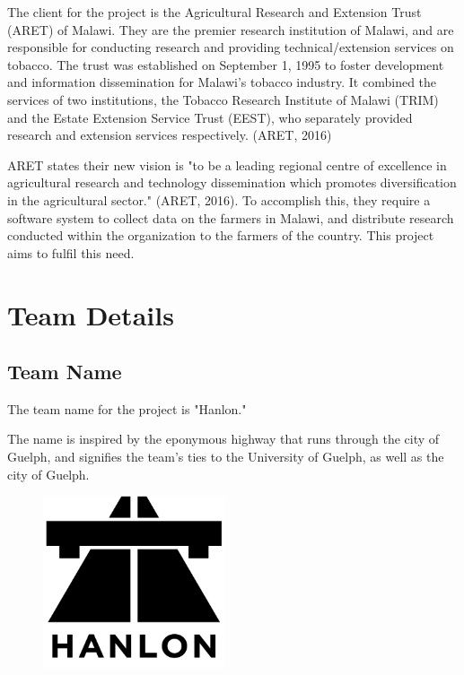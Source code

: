 \documentclass[12pt,letterpaper]{article}
\begin{document}
The client for the project is the Agricultural Research and Extension Trust (ARET) of Malawi. They are the premier research institution of Malawi, and are responsible for conducting research and providing technical/extension services on tobacco. The trust was established on September 1, 1995 to foster development and information dissemination for Malawi's tobacco industry. It combined the services of two institutions, the Tobacco Research Institute of Malawi (TRIM) and the Estate Extension Service Trust (EEST), who separately provided research and extension services respectively. (ARET, 2016)

ARET states their new vision is "to be a leading regional centre of excellence in agricultural research and technology dissemination which promotes diversification in the agricultural sector." (ARET, 2016). To accomplish this, they require a software system to collect data on the farmers in Malawi, and distribute research conducted within the organization to the farmers of the country. This project aims to fulfil this need.

\clearpage
\section{Team Details}
\subsection{Team Name}
The team name for the project is "Hanlon."\par
The name is inspired by the eponymous highway that runs through the city of Guelph, and signifies the team's ties to the University of Guelph, as well as the city of Guelph.\\

\begin{figure}[H]
	\centering	
	\includegraphics[height=2in]{img/hanlon-logo.png}
	\label{fig:kitten}
\end{figure}
\end{document}
